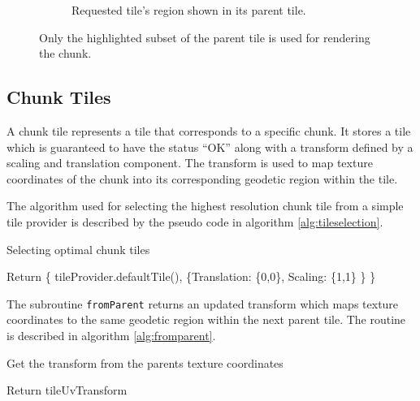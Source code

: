 \begin{figure}[htbp]
\begin{subfigure}[t]{0.3\textwidth}
        \caption{Requested tile's region shown in its parent tile.}
    \end{subfigure}
    \caption{Only the highlighted subset of the parent tile is used for rendering the chunk.}
    \label{fig:tiles}
\end{figure}

\subsection{Chunk Tiles}

A chunk tile represents a tile that corresponds to a specific chunk. It stores a tile which is guaranteed to have the status ``OK'' along with a transform defined by a scaling and translation component. The transform is used to map texture coordinates of the chunk into its corresponding geodetic region within the tile. 

The algorithm used for selecting the highest resolution chunk tile from a simple tile provider is described by the pseudo code in algorithm \ref{alg:tileselection}.

\begin{algorithm}[htp]
 \caption{Selecting optimal chunk tiles}
  Return \{ tileProvider.defaultTile(), \{Translation: \{0,0\}, Scaling: \{1,1\} \} \}
  {}
  \label{alg:tileselection}
\end{algorithm}
 
The subroutine \texttt{fromParent} returns an updated transform which maps texture coordinates to the same geodetic region within the next parent tile. The routine is described in algorithm \ref{alg:fromparent}.

\begin{algorithm}[htp]
 \caption{Get the transform from the parents texture coordinates}
  Return tileUvTransform
  {}
  \label{alg:fromparent}
\end{algorithm}

